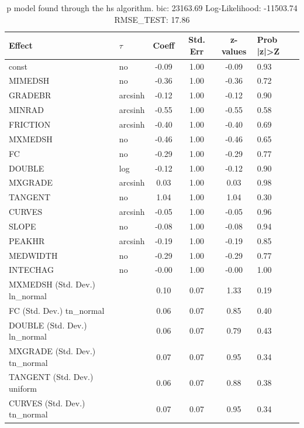 \begin{table}
	\caption{p model found through the hs algorithm. bic: 23163.69 Log-Likelihood: -11503.74 RMSE_TEST: 17.86}
	\begin{center}
		\begin{tabular}{|l|l|c|c|c|l|}
			\hline
			Effect & $\tau$ & Coeff & Std. Err & z-values & Prob |z|>Z \\
			\hline
			const & no & -0.09 & 1.00 & -0.09 & 0.93 \\
			\hline
			MIMEDSH & no & -0.36 & 1.00 & -0.36 & 0.72 \\
			\hline
			GRADEBR & arcsinh & -0.12 & 1.00 & -0.12 & 0.90 \\
			\hline
			MINRAD & arcsinh & -0.55 & 1.00 & -0.55 & 0.58 \\
			\hline
			FRICTION & arcsinh & -0.40 & 1.00 & -0.40 & 0.69 \\
			\hline
			MXMEDSH & no & -0.46 & 1.00 & -0.46 & 0.65 \\
			\hline
			FC & no & -0.29 & 1.00 & -0.29 & 0.77 \\
			\hline
			DOUBLE & log & -0.12 & 1.00 & -0.12 & 0.90 \\
			\hline
			MXGRADE & arcsinh & 0.03 & 1.00 & 0.03 & 0.98 \\
			\hline
			TANGENT & no & 1.04 & 1.00 & 1.04 & 0.30 \\
			\hline
			CURVES & arcsinh & -0.05 & 1.00 & -0.05 & 0.96 \\
			\hline
			SLOPE & no & -0.08 & 1.00 & -0.08 & 0.94 \\
			\hline
			PEAKHR & arcsinh & -0.19 & 1.00 & -0.19 & 0.85 \\
			\hline
			MEDWIDTH & no & -0.29 & 1.00 & -0.29 & 0.77 \\
			\hline
			INTECHAG & no & -0.00 & 1.00 & -0.00 & 1.00 \\
			\hline
			MXMEDSH (Std. Dev.) ln_normal &  & 0.10 & 0.07 & 1.33 & 0.19 \\
			\hline
			FC (Std. Dev.) tn_normal &  & 0.06 & 0.07 & 0.85 & 0.40 \\
			\hline
			DOUBLE (Std. Dev.) ln_normal &  & 0.06 & 0.07 & 0.79 & 0.43 \\
			\hline
			MXGRADE (Std. Dev.) tn_normal &  & 0.07 & 0.07 & 0.95 & 0.34 \\
			\hline
			TANGENT (Std. Dev.) uniform &  & 0.06 & 0.07 & 0.88 & 0.38 \\
			\hline
			CURVES (Std. Dev.) tn_normal &  & 0.07 & 0.07 & 0.95 & 0.34 \\

\end{tabular}
\end{center}
\end{table}

